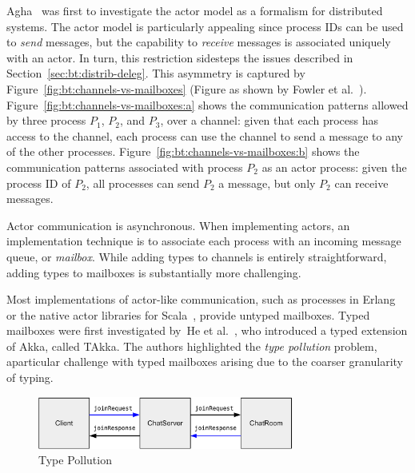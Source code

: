 \documentclass[
graybox,
envcountchap
]{svmult}
\begin{document}
\begin{bibunit}
  

  Agha~\cite{Agha90:actors} was first to investigate the actor model as a formalism
  for distributed systems. The actor model is particularly appealing since
  process IDs can be used to \emph{send} messages, but the capability to
  \emph{receive} messages is associated uniquely with an actor. In turn, this
  restriction sidesteps the issues described in
  Section~\ref{sec:bt:distrib-deleg}.
  This asymmetry is captured by Figure~\ref{fig:bt:channels-vs-mailboxes} (Figure
  as shown by Fowler et al.~\cite{FowlerLW17:mm}). Figure~\ref{fig:bt:channels-vs-mailboxes:a}
  shows the communication patterns allowed by three process $P_1$, $P_2$, and
  $P_3$, over a channel: given that each process has access to the channel,
  each process can use the channel to send a message to any of the other
  processes. Figure~\ref{fig:bt:channels-vs-mailboxes:b} shows the communication
  patterns associated with process $P_2$ as an actor process: given the process
  ID of $P_2$, all processes can send $P_2$ a message, but only $P_2$ can
  receive messages.

  Actor communication is asynchronous. When implementing actors, an
  implementation technique is to associate each process with an incoming message
  queue, or \emph{mailbox}. While adding types to channels is entirely
  straightforward, adding types to mailboxes is substantially more challenging.

  Most implementations of actor-like communication, such as processes in
  Erlang~\cite{Armstrong10:erlang} or the native actor libraries for
  Scala~\cite{HallerO09:actors}, provide untyped mailboxes.
  Typed mailboxes were first investigated by~He et al.~\cite{HeWT14:actors}, who
  introduced a typed extension of Akka, called TAkka. The authors highlighted
  the \emph{type pollution} problem, aparticular challenge with typed mailboxes
  arising due to the coarser granularity of typing.

  \begin{figure}[t]
    \centering
    \includegraphics[width=0.75\textwidth]{img/type-pollution-example.pdf}
    \caption{Type Pollution}
    \label{fig:bt:type-pollution}
  \end{figure}


\end{bibunit}
\end{document}
